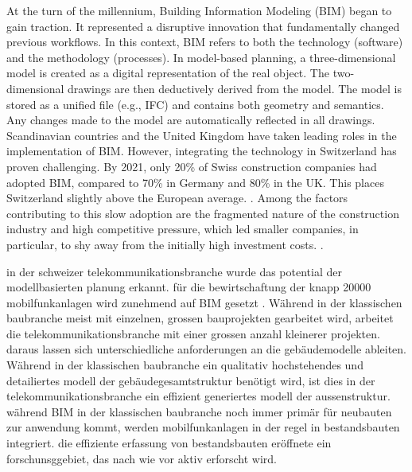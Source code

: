 \begin{English}
    At the turn of the millennium, Building Information Modeling (BIM) began to gain traction. It represented a disruptive innovation that fundamentally changed previous workflows. In this context, BIM refers to both the technology (software) and the methodology (processes). In model-based planning, a three-dimensional model is created as a digital representation of the real object. The two-dimensional drawings are then deductively derived from the model. The model is stored as a unified file (e.g., IFC) and contains both geometry and semantics. Any changes made to the model are automatically reflected in all drawings. \\
    Scandinavian countries and the United Kingdom have taken leading roles in the implementation of BIM. However, integrating the technology in Switzerland has proven challenging. By 2021, only 20\% of Swiss construction companies had adopted BIM, compared to 70\% in Germany and 80\% in the UK. This places Switzerland slightly above the European average. \cite{heinrichSchweizImBIMEuropavergleich2022}. Among the factors contributing to this slow adoption are the fragmented nature of the construction industry and high competitive pressure, which led smaller companies, in particular, to shy away from the initially high investment costs. \cite{ivanicErfolgreicheEinfuehrungBuilding2020}. \
\end{English}

\begin{German}
    in der schweizer telekommunikationsbranche wurde das potential der modellbasierten planung erkannt. für die bewirtschaftung der knapp 20000 mobilfunkanlagen wird zunehmend auf BIM gesetzt \cite{federalofficeofcommunicationsofcomLocationsMobilePhone}. Während in der klassischen baubranche meist mit einzelnen, grossen bauprojekten gearbeitet wird, arbeitet die telekommunikationsbranche mit einer grossen anzahl kleinerer projekten. daraus lassen sich unterschiedliche anforderungen an die gebäudemodelle ableiten. Während in der klassischen baubranche ein qualitativ hochstehendes und detailiertes modell der gebäudegesamtstruktur benötigt wird, ist dies in der telekommunikationsbranche ein effizient generiertes modell der aussenstruktur. während BIM in der klassischen baubranche noch immer primär für neubauten zur anwendung kommt, werden mobilfunkanlagen in der regel in bestandsbauten integriert. die effiziente erfassung von bestandsbauten eröffnete ein forschunsggebiet, das nach wie vor aktiv erforscht wird.\\
\end{German}

